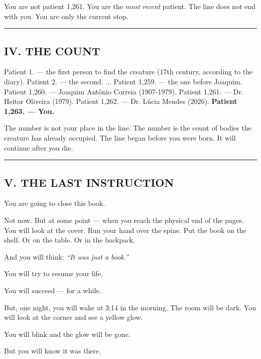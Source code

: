 \noindent You are not patient 1,261.
You are the \textit{most recent} patient.
The line does not end with you.
You are only the current stop.

\vspace{0.5em}\noindent\rule{\textwidth}{0.5pt}\vspace{0.5em}

\subsection*{IV. THE COUNT}

\noindent Patient 1. --- the first person to find the creature (17th century, according to the diary).
Patient 2. --- the second.
...
Patient 1,259. --- the one before Joaquim.
Patient 1,260. --- Joaquim Antônio Correia (1907-1979).
Patient 1,261. --- Dr. Heitor Oliveira (1979).
Patient 1,262. --- Dr. Lúcia Mendes (2026).
\textbf{Patient 1,263. --- You.}

\noindent The number is not your place in the line.
The number is the count of bodies the creature has already occupied.
The line began before you were born.
It will continue after you die.

\vspace{0.5em}\noindent\rule{\textwidth}{0.5pt}\vspace{0.5em}

\subsection*{V. THE LAST INSTRUCTION}

\noindent You are going to close this book.

\noindent Not now. But at some point --- when you reach the physical end of the pages. You will look at the cover. Run your hand over the spine. Put the book on the shelf. Or on the table. Or in the backpack.

\noindent And you will think: \textit{\textquotedblleft{}It was just a book.\textquotedblright{}}

\noindent You will try to resume your life.

\noindent You will succeed --- for a while.

\noindent But, one night, you will wake at 3:14 in the morning. The room will be dark. You will look at the corner and see a yellow glow.

\noindent You will blink and the glow will be gone.

\noindent But you will know it was there.

